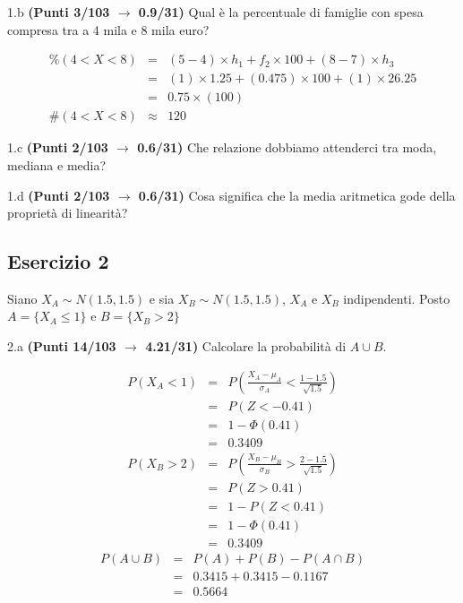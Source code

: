 \documentclass[
  11pt,
]{book}
\theoremstyle{mytheoremstyle}
\theoremstyle{mydefstyle}
\newenvironment{sol}
  {
  \begin{tcolorbox}[enhanced,breakable,arc=0.1mm,boxrule=1pt,colback=white,colframe=iblue,
  title=\bf \fontfamily{lmss}\selectfont \hspace{.5 cm} Soluzione,drop fuzzy shadow]

}{
\end{tcolorbox}
  }
\begin{document}
1.b \textbf{(Punti 3/103 \(\rightarrow\) 0.9/31)} Qual è la percentuale di famiglie con spesa compresa tra a 4 mila e 8 mila euro?

\begin{sol}
\begin{eqnarray*} \%(4<X<8) &=& (5-4)\times h_{1}+ f_{ 2 }\times 100 + (8-7)\times h_{3}  \\ 
 &=& (1)\times 1.25+ ( 0.475 )\times 100 + (1)\times 26.25  \\ 
 &=&  0.75 \times(100)\\
     \#( 4 < X < 8 ) &\approx& 120 
         \end{eqnarray*}

\end{sol}

1.c \textbf{(Punti 2/103 \(\rightarrow\) 0.6/31)} Che relazione dobbiamo attenderci tra moda, mediana e media?

1.d \textbf{(Punti 2/103 \(\rightarrow\) 0.6/31)} Cosa significa che la media aritmetica gode della proprietà di linearità?

\subsection{Esercizio 2}\label{esercizio-2-27}

Siano \(X_A\sim N(1.5,1.5)\) e sia \(X_B\sim N(1.5,1.5)\), \(X_A\) e \(X_B\) indipendenti. Posto \(A=\{X_A\le 1\}\) e \(B=\{X_B>2\}\)

2.a \textbf{(Punti 14/103 \(\rightarrow\) 4.21/31)} Calcolare la probabilità di \(A\cup B\).

\begin{sol}
\begin{eqnarray*}
      P( X_A   <   1 ) 
        &=& P\left(  \frac { X_A  -  \mu_A }{ \sigma_A }  <  \frac { 1  -  1.5 }{\sqrt{ 1.5 }} \right)  \\
                 &=& P\left(  Z   <   -0.41 \right) \\    
                 &=&  1-\Phi( 0.41 ) \\ &=&  0.3409 
      \end{eqnarray*}\begin{eqnarray*}
      P( X_B   >   2 ) 
        &=& P\left(  \frac { X_B  -  \mu_B }{ \sigma_B }  >  \frac { 2  -  1.5 }{\sqrt{ 1.5 }} \right)  \\
                 &=& P\left(  Z   >   0.41 \right) \\    &=& 1-P(Z< 0.41 )\\ 
                 &=&  1-\Phi( 0.41 ) \\ &=&  0.3409 
      \end{eqnarray*}
\begin{eqnarray*}
  P(A\cup B) &=&  P(A)+P(B)-P(A\cap B)\\
  &=& 0.3415+0.3415-0.1167\\
  &=& 0.5664
\end{eqnarray*}

\end{sol}
\end{document}
